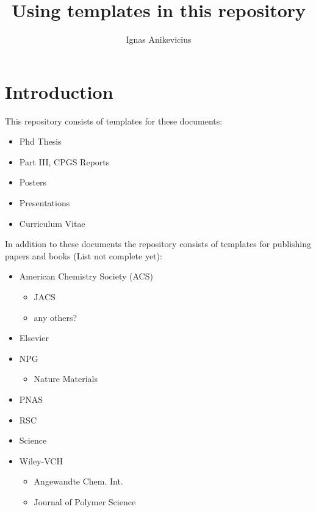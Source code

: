 


\title{Using templates in this repository}
\author{Ignas Anikevicius}



\maketitle

\section{Introduction}

This repository consists of templates for these documents:
\begin{itemize}
    \item Phd Thesis
    \item Part III, CPGS Reports
    \item Posters
    \item Presentations
    \item Curriculum Vitae
\end{itemize}

In addition to these documents the repository consists of templates for
publishing papers and books (List not complete yet):
\begin{itemize}
    \item American Chemistry Society (ACS)
        \begin{itemize}
            \item JACS
            \item any others?
        \end{itemize}
    \item Elsevier
    \item NPG
        \begin{itemize}
            \item Nature Materials
        \end{itemize}
    \item PNAS
    \item RSC
    \item Science
    \item Wiley-VCH
        \begin{itemize}
            \item Angewandte Chem. Int.
            \item Journal of Polymer Science
        \end{itemize}
\end{itemize}

